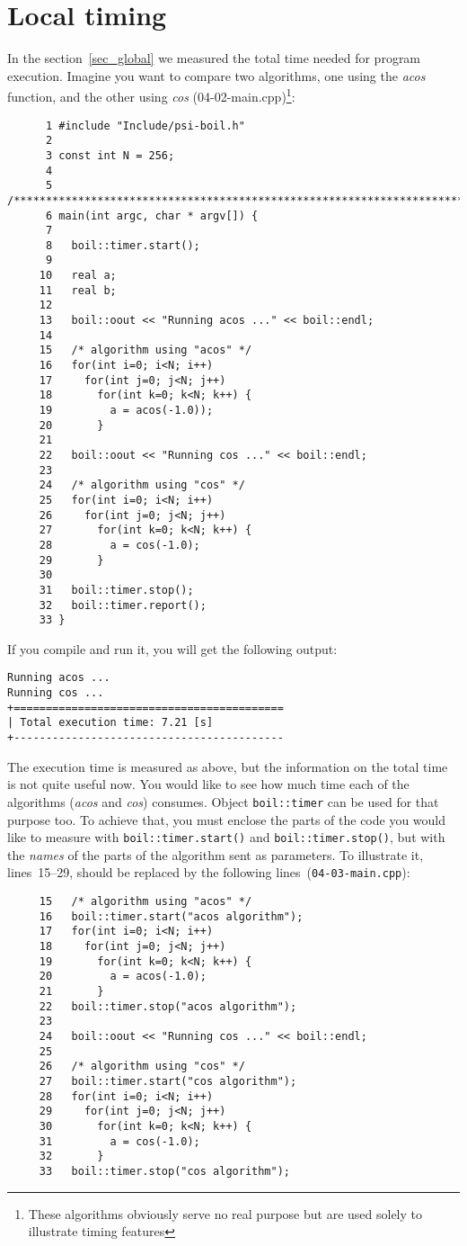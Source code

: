 \section{Local timing}
\label{sec_local}

In the section~\ref{sec_global} we measured the total time needed
for program execution. Imagine you want to compare two algorithms,
one using the {\em acos} function, and the other using {\em cos}
(04-02-main.cpp)\footnote{These algorithms obviously serve no real 
purpose but are used solely to illustrate timing features}:
%
{\small \begin{verbatim}
      1 #include "Include/psi-boil.h"
      2
      3 const int N = 256;
      4
      5 /****************************************************************************/
      6 main(int argc, char * argv[]) {
      7
      8   boil::timer.start();
      9
     10   real a;
     11   real b;
     12
     13   boil::oout << "Running acos ..." << boil::endl;
     14
     15   /* algorithm using "acos" */
     16   for(int i=0; i<N; i++)
     17     for(int j=0; j<N; j++)
     18       for(int k=0; k<N; k++) {
     19         a = acos(-1.0));
     20       }
     21
     22   boil::oout << "Running cos ..." << boil::endl;
     23
     24   /* algorithm using "cos" */
     25   for(int i=0; i<N; i++)
     26     for(int j=0; j<N; j++)
     27       for(int k=0; k<N; k++) {
     28         a = cos(-1.0);
     29       }
     30
     31   boil::timer.stop();
     32   boil::timer.report();
     33 }
\end{verbatim}}
%
If you compile and run it, you will get the following output:
%
{\small \begin{verbatim}
Running acos ...
Running cos ...
+==========================================
| Total execution time: 7.21 [s]
+------------------------------------------
\end{verbatim}}
%
The execution time is measured as above, but the information on the 
total time is not quite useful now. You would like to see how much
time each of the algorithms ({\em acos} and {\em cos}) consumes.
Object {\tt boil::timer} can be used for that purpose too. To achieve
that, you must enclose the parts of the code you would like to 
measure with {\tt boil::timer.start()} and {\tt boil::timer.stop()},
but with the {\em names} of the parts of the algorithm sent as
parameters. To illustrate it, lines~15--29, should be replaced by the 
following lines~({\tt 04-03-main.cpp}):
%
{\small \begin{verbatim}
     15   /* algorithm using "acos" */
     16   boil::timer.start("acos algorithm");
     17   for(int i=0; i<N; i++)
     18     for(int j=0; j<N; j++)
     19       for(int k=0; k<N; k++) {
     20         a = acos(-1.0);
     21       }
     22   boil::timer.stop("acos algorithm");
     23
     24   boil::oout << "Running cos ..." << boil::endl;
     25
     26   /* algorithm using "cos" */
     27   boil::timer.start("cos algorithm");
     28   for(int i=0; i<N; i++)
     29     for(int j=0; j<N; j++)
     30       for(int k=0; k<N; k++) {
     31         a = cos(-1.0);
     32       }
     33   boil::timer.stop("cos algorithm");
\end{verbatim}}
